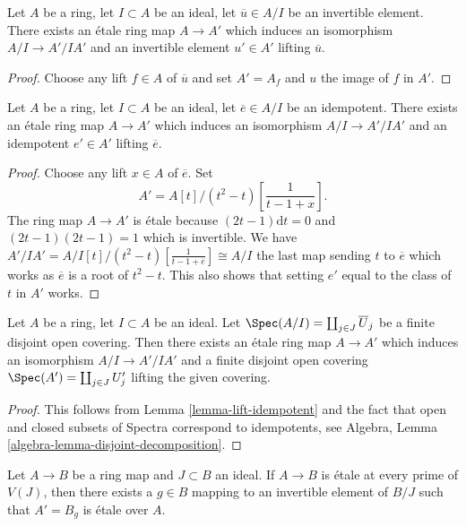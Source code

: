 \begin{lemma}
\label{lemma-lift-invertible-element}
Let $A$ be a ring, let $I \subset A$ be an ideal, let $\overline{u} \in A/I$
be an invertible element. There exists an \'etale ring map $A \to A'$ which
induces an isomorphism $A/I \to A'/IA'$ and an invertible element $u' \in A'$
lifting $\overline{u}$.
\end{lemma}

\begin{proof}
Choose any lift $f \in A$ of $\overline{u}$ and set $A' = A_f$ and $u$
the image of $f$ in $A'$.
\end{proof}

\begin{lemma}
\label{lemma-lift-idempotent}
Let $A$ be a ring, let $I \subset A$ be an ideal, let $\overline{e} \in A/I$
be an idempotent. There exists an \'etale ring map $A \to A'$ which
induces an isomorphism $A/I \to A'/IA'$ and an idempotent $e' \in A'$
lifting $\overline{e}$.
\end{lemma}

\begin{proof}
Choose any lift $x \in A$ of $\overline{e}$. Set
$$
A' = A[t]/(t^2 - t)\left[\frac{1}{t - 1 + x}\right].
$$
The ring map $A \to A'$ is \'etale because $(2t - 1)\text{d}t = 0$
and $(2t - 1)(2t - 1) = 1$ which is invertible. We have
$A'/IA' = A/I[t]/(t^2 - t)[\frac{1}{t - 1 + \overline{e}}] \cong A/I$
the last map sending $t$ to $\overline{e}$ which works as
$\overline{e}$ is a root of $t^2 - t$. This also shows that setting
$e'$ equal to the class of $t$ in $A'$ works.
\end{proof}

\begin{lemma}
\label{lemma-lift-open-covering}
Let $A$ be a ring, let $I \subset A$ be an ideal. Let
$\Spec(A/I) = \coprod_{j \in J} \overline{U}_j$ be a finite disjoint open
covering. Then there exists an \'etale ring map $A \to A'$ which
induces an isomorphism $A/I \to A'/IA'$ and a finite disjoint open covering
$\Spec(A') = \coprod_{j \in J} U'_j$ lifting the given covering.
\end{lemma}

\begin{proof}
This follows from Lemma \ref{lemma-lift-idempotent} and
the fact that open and closed subsets of Spectra correspond
to idempotents, see Algebra, Lemma \ref{algebra-lemma-disjoint-decomposition}.
\end{proof}

\begin{lemma}
\label{lemma-localize-upstairs}
Let $A \to B$ be a ring map and $J \subset B$ an ideal. If
$A \to B$ is \'etale at every prime of $V(J)$, then there exists
a $g \in B$ mapping to an invertible element
of $B/J$ such that $A' = B_g$ is \'etale over $A$.
\end{lemma}

